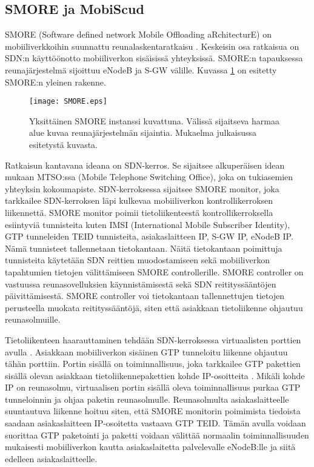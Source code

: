 
\subsection{SMORE ja MobiScud} \label{smore}
SMORE (Software defined network Mobile Offloading aRchitecturE) on mobiiliverkkoihin suunnattu reunalaskentaratkaisu \cite{cho2014smore}.
Keskeisin osa ratkaisua on SDN:n käyttöönotto mobiiliverkon sisäisissä yhteyksissä.
SMORE:n tapauksessa reunajärjestelmä sijoittuu eNodeB ja S-GW välille. Kuvassa \ref{fig:smore} on esitetty SMORE:n yleinen rakenne.

\begin{figure}[tb]
\texttt{[image: SMORE.eps]}
\caption{Yksittäinen SMORE instanssi kuvattuna. Välissä sijaitseva harmaa alue kuvaa reunajärjestelmän sijaintia. Mukaelma julkaisussa \cite{cho2014smore} esitetystä kuvasta.} \label{fig:smore}
\end{figure}


Ratkaisun kantavana ideana on SDN-kerros. Se sijaitsee alkuperäisen idean mukaan MTSO:ssa (Mobile Telephone Switching Office), joka on tukiasemien yhteyksin kokoumapiste.
SDN-kerroksessa sijaitsee SMORE monitor, joka tarkkailee SDN-kerroksen läpi kulkevaa mobiiliverkon kontrollikerroksen liikennettä. SMORE monitor poimii tietoliikenteestä kontrollikerroksella esiintyviä tunnisteita kuten IMSI (International Mobile Subscriber Identity), GTP tunneleiden TEID tunnisteita, asiakaslaitteen IP, S-GW IP, eNodeB IP. Nämä tunnisteet tallennetaan tietokantaan.
Näitä tietokantaan poimittuja tunnisteita käytetään SDN reittien muodostamiseen sekä mobiiliverkon tapahtumien tietojen välittämiseen SMORE controllerille.
SMORE controller on vastuussa reunasovelluksien käynnistämisestä sekä SDN reitityssääntöjen päivittämisestä. SMORE controller voi tietokantaan tallennettujen tietojen perusteella muokata reitityssääntöjä, siten että asiakkaan tietoliikenne ohjautuu reunasolmuille. 

Tietoliikenteen haarauttaminen tehdään SDN-kerroksessa virtuaalisten porttien avulla \cite{cho2014smore}.
Asiakkaan mobiiliverkon sisäinen GTP tunneloitu liikenne ohjautuu tähän porttiin.
Portin sisällä on toiminnallisuus, joka tarkkailee GTP pakettien sisällä olevan asiakkaan tietoliikennepakettien kohde IP-osoitteita \cite{cho2014smore}.
Mikäli kohde IP on reunasolmu, virtuaalisen portin sisällä oleva toiminnallisuus purkaa GTP tunneloinnin ja ohjaa paketin reunasolmulle.
Reunasolmulta asiakaslaitteelle suuntautuva liikenne hoituu siten, että SMORE monitorin poimimista tiedoista saadaan asiakaslaitteen IP-osoitetta vastaava GTP TEID.
Tämän avulla voidaan suorittaa GTP paketointi ja paketti voidaan välittää normaalin toiminnallisuuden mukaisesti mobiiliverkon kautta asiakaslaitetta palvelevalle eNodeB:lle ja siitä edelleen asiakaslaitteelle. 

